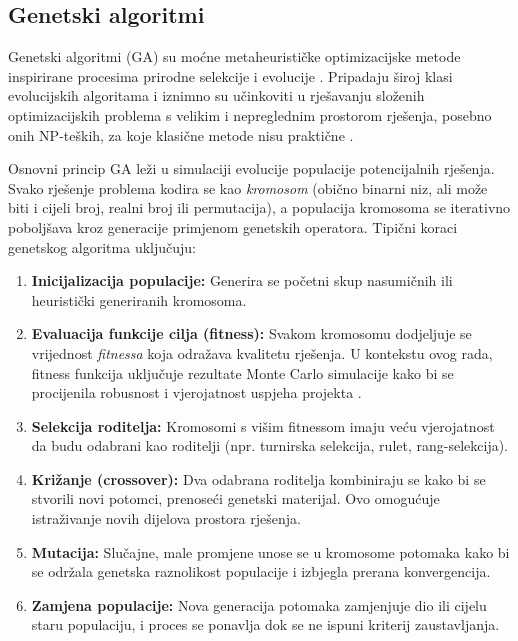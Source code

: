 \subsection{Genetski algoritmi}

Genetski algoritmi (GA) su moćne metaheurističke optimizacijske metode inspirirane procesima prirodne selekcije i evolucije \cite{Goldberg1989, Mitchell1998}. Pripadaju široj klasi evolucijskih algoritama i iznimno su učinkoviti u rješavanju složenih optimizacijskih problema s velikim i nepreglednim prostorom rješenja, posebno onih NP-teških, za koje klasične metode nisu praktične \cite{Gandomi2013, Kaveh2012}.

Osnovni princip GA leži u simulaciji evolucije populacije potencijalnih rješenja. Svako rješenje problema kodira se kao \textit{kromosom} (obično binarni niz, ali može biti i cijeli broj, realni broj ili permutacija), a populacija kromosoma se iterativno poboljšava kroz generacije primjenom genetskih operatora. Tipični koraci genetskog algoritma uključuju:

\begin{enumerate}
    \item \textbf{Inicijalizacija populacije:} Generira se početni skup nasumičnih ili heuristički generiranih kromosoma.
    \item \textbf{Evaluacija funkcije cilja (fitness):} Svakom kromosomu dodjeljuje se vrijednost \textit{fitnessa} koja odražava kvalitetu rješenja. U kontekstu ovog rada, fitness funkcija uključuje rezultate Monte Carlo simulacije kako bi se procijenila robusnost i vjerojatnost uspjeha projekta \cite{Gandomi2013}.
    \item \textbf{Selekcija roditelja:} Kromosomi s višim fitnessom imaju veću vjerojatnost da budu odabrani kao roditelji (npr. turnirska selekcija, rulet, rang-selekcija).
    \item \textbf{Križanje (crossover):} Dva odabrana roditelja kombiniraju se kako bi se stvorili novi potomci, prenoseći genetski materijal. Ovo omogućuje istraživanje novih dijelova prostora rješenja.
    \item \textbf{Mutacija:} Slučajne, male promjene unose se u kromosome potomaka kako bi se održala genetska raznolikost populacije i izbjegla prerana konvergencija.
    \item \textbf{Zamjena populacije:} Nova generacija potomaka zamjenjuje dio ili cijelu staru populaciju, i proces se ponavlja dok se ne ispuni kriterij zaustavljanja.
\end{enumerate}

